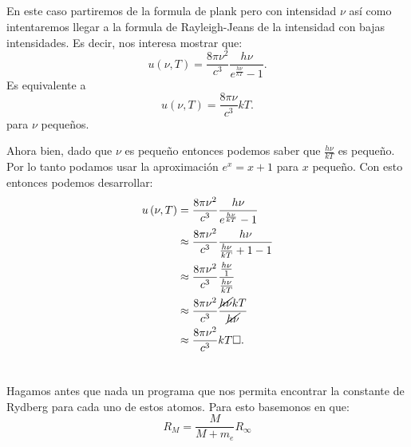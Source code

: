 \documentclass{report}
\begin{document}
\section{}

\section{}

En este caso partiremos de la formula de plank pero con intensidad $\nu$ así como intentaremos llegar a la formula de Rayleigh-Jeans de la intensidad con bajas intensidades. Es decir, nos interesa mostrar que: \[
u\left( \nu, T \right) = \frac{8\pi \nu^2}{c^3} \frac{h\nu}{e^{\frac{h\nu}{kT}} - 1}
.\] Es equivalente a \[
u\left( \nu, T \right) = \frac{8\pi \nu}{c^{3}}kT
.\] para $\nu$ pequeños.

Ahora bien, dado que $\nu$ es pequeño entonces podemos saber que $\frac{h\nu}{kT}$ es pequeño. Por lo tanto podamos usar la aproximación $e^{x} = x + 1$ para $x$ pequeño. Con esto entonces podemos desarrollar:
\begin{align*}
  u\left( \nu,T \right) &= \frac{8\pi \nu^2}{c^{3}} \frac{h\nu}{e^{\frac{h\nu}{kT}}- 1} \\
			&\approx \frac{8\pi \nu^2}{c^3} \frac{h\nu}{\frac{h\nu}{kT} + 1 - 1}\\
			&\approx \frac{8\pi \nu^2}{c^{3}}\frac{\frac{h\nu}{1}}{\frac{h\nu}{kT}}\\
			&\approx \frac{8\pi \nu^2}{c^{3}}\frac{\cancel{h\nu} kT}{\cancel{h\nu}}\\
			&\approx \frac{8\pi \nu^2}{c^{3}}kT \square
.\end{align*}

\chapter{}

\chapter{}

\chapter{}

Hagamos antes que nada un programa que nos permita encontrar la constante de Rydberg para cada uno de estos atomos. Para esto basemonos en que: \[
  R_M = \frac{M}{M + m_e} R_\infty\]
\end{document}
